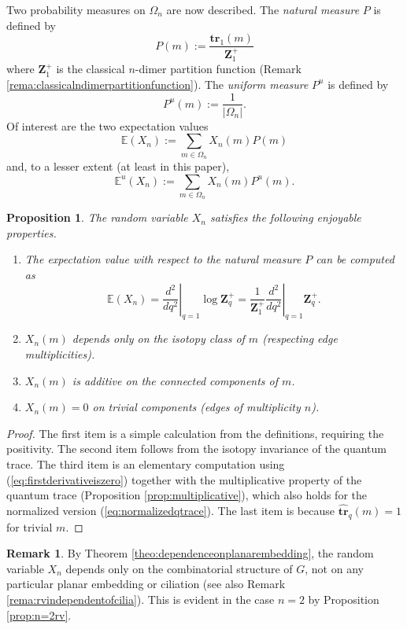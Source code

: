 \documentclass[12pt, reqno]{amsart}
\newtheorem{prop}[theo]{Proposition}
\theoremstyle{definition}
\newtheorem{rema}[theo]{Remark}
\renewcommand{\hat}{\widehat}
\newcommand{\be}{\begin{equation}}
\newcommand{\ee}{\end{equation}}
\newcommand{\Zq}{\mathbf{Z}_q}%
\newcommand{\E}{\mathbb{E}}%
\newcommand{\htrq}{\hat{\mathbf{tr}}_q}%
\begin{document}
Two probability measures on $\Omega_n$ are now described.   The \emph{natural measure} $P$ is defined by 
$$
P(m):=\frac{\mathbf{tr}_1(m)}{\mathbf{Z}_1^+}
$$ 
where $\mathbf{Z}_1^+$ is the classical $n$-dimer partition function (Remark \ref{rema:classicalndimerpartitionfunction}).  The \emph{uniform measure} $P^u$ is defined by 
$$
P^u(m):=\frac{1}{|\Omega_n|}.
$$  
Of interest are the two expectation values 
$$
\E(X_n):=\sum_{m\in\Omega_n}X_n(m)P(m)
$$ 
and, to a lesser extent (at least in this paper), 
$$
\E^u(X_n):=\sum_{m\in\Omega_n}X_n(m)P^u(m).
$$ 

\begin{prop}\label{secondderiv}
The random variable $X_n$ satisfies the following enjoyable properties.
\begin{enumerate}
\item  
The expectation value with respect to the natural measure $P$ can be computed as 
\be\label{eq:expectationvalueofXn}
\E(X_n)=\left.\frac{d^2}{dq^2}\right|_{q=1}\log\Zq^+=\frac{1}{\mathbf{Z}_1^+}\left.\frac{d^2}{dq^2}\right|_{q=1}\Zq^+.
\ee
\item  
$X_n(m)$ depends only on the isotopy class of $m$ (respecting edge multiplicities).  
\item  
$X_n(m)$ is additive on the connected components of $m$.  
\item  
$X_n(m)=0$ on trivial components (edges of multiplicity $n$).  
\end{enumerate}
\end{prop}

\begin{proof}
The first item is a simple calculation from the definitions, requiring the positivity.  The second item follows from the isotopy invariance of the quantum trace.  The third item is an elementary computation using (\ref{eq:firstderivativeiszero}) together with the multiplicative property of the quantum trace (Proposition \ref{prop:multiplicative}), which also holds for the normalized version (\ref{eq:normalizedqtrace}).  The last item is because $\htrq(m)=1$ for trivial $m$.  
\end{proof}

\begin{rema}
By Theorem \ref{theo:dependenceonplanarembedding}, the random variable $X_n$ depends only on the combinatorial structure of $G$, not on any particular planar embedding or ciliation (see also Remark \ref{rema:rvindependentofcilia}).  This is evident in the case $n=2$ by Proposition \ref{prop:n=2rv}.  
\end{rema}
\end{document}
